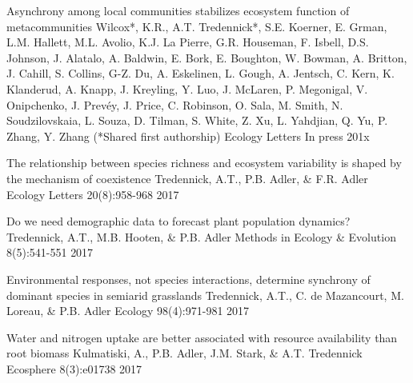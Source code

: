 

\begin{pubentries}

\pubentry
    {Asynchrony among local communities stabilizes ecosystem function of metacommunities} %
    {Wilcox*, K.R., A.T. Tredennick*, S.E. Koerner, E. Grman, L.M. Hallett, M.L. Avolio, K.J. La Pierre, G.R. Houseman, F. Isbell, D.S. Johnson, J. Alatalo, A. Baldwin, E. Bork, E. Boughton, W. Bowman, A. Britton, J. Cahill, S. Collins, G-Z. Du, A. Eskelinen, L. Gough, A. Jentsch, C. Kern, K. Klanderud, A. Knapp, J. Kreyling, Y. Luo, J. McLaren, P. Megonigal, V. Onipchenko, J. Prevéy, J. Price, C. Robinson, O. Sala, M. Smith, N. Soudzilovskaia, L. Souza, D. Tilman, S. White, Z. Xu, L. Yahdjian, Q. Yu, P. Zhang, Y. Zhang (*Shared first authorship)} %
    {Ecology Letters} %
    {In press} %
    {201x} %

  \pubentry
    {The relationship between species richness and ecosystem variability is shaped by the mechanism of coexistence} %
    {Tredennick, A.T., P.B. Adler, \& F.R. Adler} %
    {Ecology Letters} %
    {20(8):958-968} %
    {2017} %

  \pubentry
    {Do we need demographic data to forecast plant population dynamics?} %
    {Tredennick, A.T., M.B. Hooten, \& P.B. Adler} %
    {Methods in Ecology \& Evolution} %
    {8(5):541-551} %
    {2017} %

  \pubentry
    {Environmental responses, not species interactions, determine synchrony of dominant species in semiarid grasslands} %
    {Tredennick, A.T., C. de Mazancourt, M. Loreau, \& P.B. Adler} %
    {Ecology} %
    {98(4):971-981} %
    {2017} %

  \pubentry
    {Water and nitrogen uptake are better associated with resource availability than root biomass} %
    {Kulmatiski, A., P.B. Adler, J.M. Stark, \& A.T. Tredennick} %
    {Ecosphere} %
    {8(3):e01738} %
    {2017} %


\end{pubentries}
